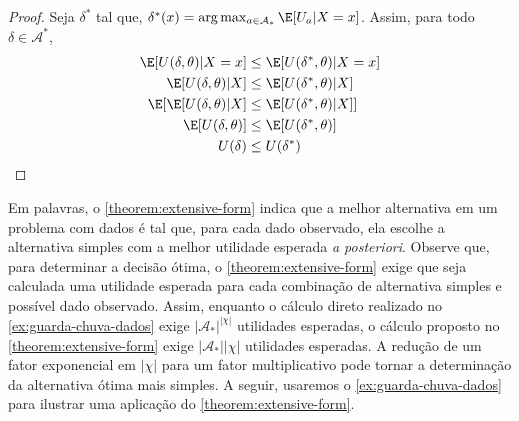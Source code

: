 \begin{proof}
 Seja $\delta^*$ tal que,  
 $\delta^{*}(x) = \arg\max_{a \in \mathcal{A}_{*}}\E[U_{a}|X=x]$.
 Assim, para todo $\delta \in \mathcal{A}^*$,
 \begin{align*}
  \E[U(\delta,\theta)|X=x]
  &\leq \E[U(\delta^*,\theta)|X=x] \\
  \E[U(\delta,\theta)|X]
  &\leq \E[U(\delta^*,\theta)|X] \\
  \E[\E[U(\delta,\theta)|X]
  &\leq \E[U(\delta^*,\theta)|X]] \\
  \E[U(\delta,\theta)]
  &\leq \E[U(\delta^*,\theta)] \\
  U(\delta) &\leq U(\delta^*)
 \end{align*}
\end{proof}

Em palavras, o \cref{theorem:extensive-form} indica que
a melhor alternativa em um problema com dados é
tal que, para cada dado observado, ela escolhe a
alternativa simples com a melhor utilidade esperada
\emph{a posteriori}. Observe que, para determinar a
decisão ótima, o \cref{theorem:extensive-form} exige que
seja calculada uma utilidade esperada para cada
combinação de alternativa simples e possível dado observado. Assim, enquanto o cálculo direto
realizado no \cref{ex:guarda-chuva-dados}
exige $|\mathcal{A}_{*}|^{|\chi|}$ utilidades esperadas,
o cálculo proposto no \cref{theorem:extensive-form} exige
$|\mathcal{A}_{*}||\chi|$ utilidades esperadas.
A redução de um fator exponencial em $|\chi|$ para um
fator multiplicativo pode tornar a determinação da
alternativa ótima mais simples.
A seguir, usaremos o \cref{ex:guarda-chuva-dados} para 
ilustrar uma aplicação do \cref{theorem:extensive-form}.

